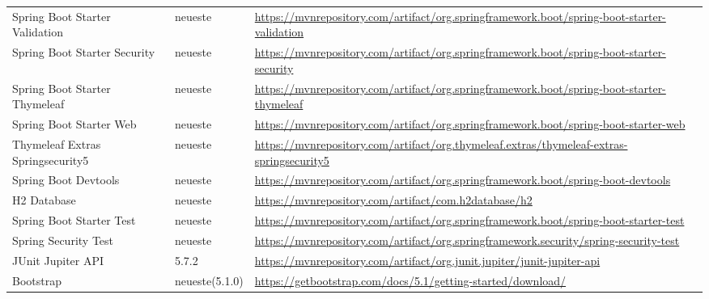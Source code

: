 \begin{longtable}[h]{p{4cm} p{2cm} p{8cm}}
    Spring Boot Starter Validation   & neueste          & \url{https://mvnrepository.com/artifact/org.springframework.boot/spring-boot-starter-validation} \\
    \rowcolor[HTML]{E7E7E7}
    Spring Boot Starter Security     & neueste          & \url{https://mvnrepository.com/artifact/org.springframework.boot/spring-boot-starter-security}   \\
    Spring Boot Starter Thymeleaf    & neueste          & \url{https://mvnrepository.com/artifact/org.springframework.boot/spring-boot-starter-thymeleaf}  \\
    \rowcolor[HTML]{E7E7E7}
    Spring Boot Starter Web          & neueste          & \url{https://mvnrepository.com/artifact/org.springframework.boot/spring-boot-starter-web}        \\
    Thymeleaf Extras Springsecurity5 & neueste          & \url{https://mvnrepository.com/artifact/org.thymeleaf.extras/thymeleaf-extras-springsecurity5}   \\
    \rowcolor[HTML]{E7E7E7}
    Spring Boot Devtools             & neueste          & \url{https://mvnrepository.com/artifact/org.springframework.boot/spring-boot-devtools}           \\
    H2 Database                      & neueste          & \url{https://mvnrepository.com/artifact/com.h2database/h2}                                       \\
    \rowcolor[HTML]{E7E7E7}
    Spring Boot Starter Test         & neueste          & \url{https://mvnrepository.com/artifact/org.springframework.boot/spring-boot-starter-test}       \\
    Spring Security Test             & neueste          & \url{https://mvnrepository.com/artifact/org.springframework.security/spring-security-test}       \\
    \rowcolor[HTML]{E7E7E7}
    JUnit Jupiter API                & 5.7.2            & \url{https://mvnrepository.com/artifact/org.junit.jupiter/junit-jupiter-api}                     \\
    Bootstrap                        & neueste(5.1.0)   & \url{https://getbootstrap.com/docs/5.1/getting-started/download/}                                \\
\end{longtable}

